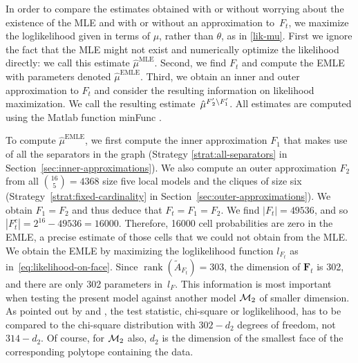 \documentclass[aos,noinfoline]{imsart}
\DeclareMathOperator{\rank}{rank}
\DeclareMathOperator{\MLE}{MLE}
\DeclareMathOperator{\EMLE}{EMLE}
\newcommand{\hmuFF}{\hat{\mu}^{F\smash{'_2\setminus F'_1}}}
\newcommand{\Fbf}{\mathbf{F}}
\theoremstyle{remark}
\theoremstyle{definition}
\begin{document}
In order to compare the estimates obtained with or without worrying about the existence of the MLE and with or
without an approximation to~$F_t$, we maximize the loglikelihood given in terms of $\mu$, rather than $\theta$, as in
\eqref{lik-mu}. 
First we ignore the fact that the MLE might not exist and  numerically optimize the likelihood directly: we call this estimate $\hat{\mu}^{\MLE}$. Second, we find $F_t$ and compute the EMLE with
parameters denoted $\hat{\mu}^{\EMLE}$. Third, we obtain an inner and outer approximation to $F_t$ and consider the
resulting information on likelihood maximization. We call the resulting estimate~$\hmuFF$.
All estimates are computed using the Matlab function minFunc \citep{minFunc}.

To compute $\hat{\mu}^{\EMLE}$, we first compute the inner approximation $F_{1}$ that makes use of all the separators in
the graph (Strategy \ref{strat:all-separators} in Section~\ref{sec:inner-approximations}).  We also compute an outer
approximation $F_{2}$ from all $\binom{16}{5}=\num{4368}$ size five local models and the cliques of size six
(Strategy~\ref{strat:fixed-cardinality} in Section~\ref{sec:outer-approximations}).  We obtain $F_1=F_2$ and thus deduce
that $F_{t}=F_{1}=F_{2}$. We find $|F_t|=\num{49536}$, and so $|F_t^c|=2^{16}-\num{49536}=\num{16000}$. Therefore,
\num{16000} cell probabilities are zero in the EMLE, a precise estimate of those cells that we could not obtain from the MLE.  We obtain the EMLE by maximizing the loglikelihood function
$l_{F_{t}}$ as in~\eqref{eq:likelihood-on-face}.  Since $\rank(\tilde A_{F_t})=303$, the dimension of $\Fbf_t$ is 302, and
there are only 302 parameters in~$l_F$. This information is most important when testing the present model against another model ${\cal M}_2$ of smaller dimension. As pointed out by \cite{Geyer09:Likelihood_inference_in_exponential_families} and \cite{FienbergRinaldo12:MLE_in_loglinear_models}, the test statistic,  chi-square or  loglikelihood, has to be compared to the chi-square distribution with $302-d_2$ degrees of freedom, not $314-d_2$. Of course, for ${\cal M}_2$ also, $d_2$ is the dimension of the smallest face of the corresponding polytope containing the data.
\end{document}
